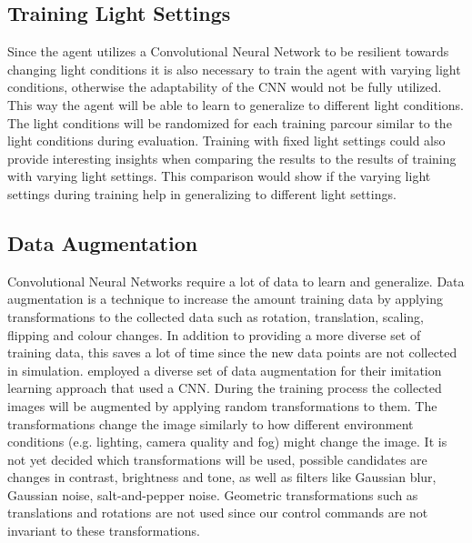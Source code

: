

\subsection*{Training Light Settings}
Since the agent utilizes a Convolutional Neural Network to be resilient towards changing light conditions it is also necessary to train the agent with varying light conditions, otherwise the adaptability of the CNN would not be fully utilized. This way the agent will be able to learn to generalize to different light conditions. The light conditions will be randomized for each training parcour similar to the light conditions during evaluation.
Training with fixed light settings could also provide interesting insights when comparing the results to the results of training with varying light settings. This comparison would show if the varying light settings during training help in generalizing to different light settings.





\subsection*{Data Augmentation}

Convolutional Neural Networks require a lot of data to learn and generalize. Data augmentation is a technique to increase the amount training data by applying transformations to the collected data such as rotation, translation, scaling, flipping and colour changes. In addition to providing a more diverse set of training data, this saves a lot of time since the new data points are not collected in simulation. \autocite{conditional_imitation_learning} employed a diverse set of data augmentation for their imitation learning approach that used a CNN.
During the training process the collected images will be augmented by applying random transformations to them. The transformations change the image similarly to how different environment conditions (e.g. lighting, camera quality and fog) might change the image. It is not yet decided which transformations will be used, possible candidates are changes in contrast, brightness and tone, as well as filters like Gaussian blur, Gaussian noise, salt-and-pepper noise.
Geometric transformations such as translations and rotations are not used since our control commands are not invariant to these transformations.


